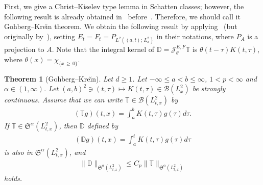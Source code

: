\documentclass[10pt]{amsart}
\newtheorem{theo}{Theorem}[section]
\theoremstyle{definition}
\numberwithin{equation}{section}
\newcommand{\BD}{\mathbb{D}}
\newcommand{\BT}{\mathbb{T}}
\newcommand{\CB}{\mathcal{B}}
\newcommand{\CJ}{\mathcal{J}}
\newcommand{\FS}{\mathfrak{S}}
\newcommand{\al}{\alpha}
\newcommand{\ta}{\tau}
\renewcommand{\th}{\theta}
\newcommand{\ch}{\chi}
\newcommand{\I}{\infty}
\newcommand{\tx}{{t,x}}
\begin{document}
First, we give a Christ--Kiselev type lemma in Schatten classes; however, the following result is already obtained in~\cite{1970Go-Kre} before~\cite{2001CK}. Therefore, we should call it Gohberg--Kre\u{\i}n theorem. We obtain the following result by applying~\cite[Theorem~7.2]{2003BS} (but originally by~\cite[Theorem~III.6.2]{1970Go-Kre}), setting $E_t = F_t = P_{L^2((a,t);\,L^2_x)}$ in their notations, where $P_A$ is a projection to $A$. Note that the integral kernel of $\BD = \CJ^{E,F}_\th \BT$ is $\th(t-\ta)K(t,\ta)$, where $\th(x)=\ch_{\{x \,\ge\,0\}}$.

\begin{theo}[Gohberg--Kre\u{\i}n] \label{SCK}
Let $d \ge 1$. Let $-\I \leq a < b \leq \I$, $1 < p < \I$ and $\al \in (1,\I)$. Let $(a,b)^2 \ni (t,\ta) \mapsto K(t,\ta)\in \CB(L^2_x)$ be strongly continuous. Assume that we can write $\BT \in \CB(L^2_\tx)$ by
\begin{align}
(\BT g)(t,x) = \int_a^b K(t,\ta)g(\ta)d\ta.
\end{align}
If $\BT \in \FS^\al(L^2_\tx)$, then $\BD$ defined by
\begin{align}
(\BD g)(t,x) = \int_a^t K(t,\ta)g(\ta)d\ta
\end{align}
is also in $\FS^\al(L^2_\tx)$, and
\begin{align}
\|\BD\|_{\FS^\al\left(L^2_\tx\right)} \le C_p \|\BT\|_{\FS^\al\left(L^2_\tx\right)}
\end{align}
holds.
\end{theo}
\end{document}
